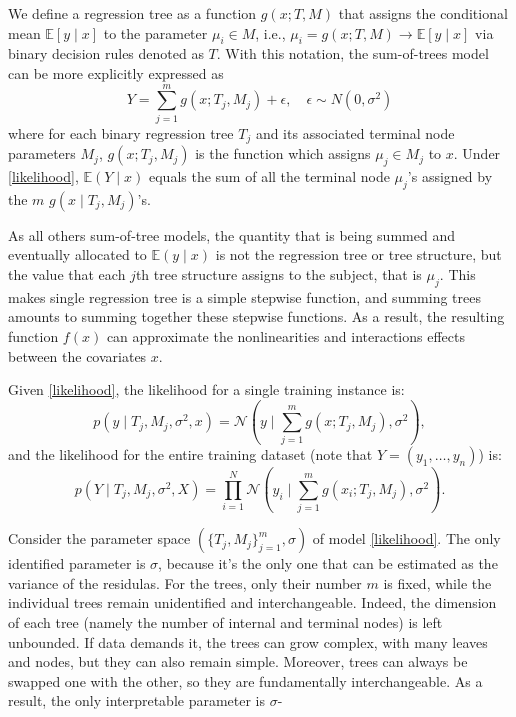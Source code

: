 \documentclass[a4paper,11pt]{article}
\begin{document}
We define a regression tree as a function \( g(x; T, M) \) that assigns the conditional mean \( \mathbb{E}[y \mid x] \) to the parameter \( \mu_i \in M \), i.e., \( \mu_i = g(x; T, M) \rightarrow \mathbb{E}[y \mid x] \) via binary decision rules denoted as \( T \). With this notation, the sum-of-trees model can be more explicitly expressed as
\begin{equation}
Y = \sum_{j=1}^m g(x; T_j, M_j) + \epsilon, \quad \epsilon \sim N(0, \sigma^2) \label{likelihood}
\end{equation}
where for each binary regression tree \( T_j \) and its associated terminal node parameters \( M_j \), \( g(x; T_j, M_j) \) is the function which assigns \( \mu_{j} \in M_j \) to \( x \). Under \eqref{likelihood}, \( \mathbb{E}(Y \mid x) \) equals the sum of all the terminal node \( \mu_{j} \)'s assigned by the $m$ \( g(x \mid T_j, M_j) \)'s.

 As all others sum-of-tree models, the quantity that is being summed and eventually allocated to \( \mathbb{E}(y \mid x) \) is not the regression tree or tree structure, but the value that each \( j \)th tree structure assigns to the subject, that is \( \mu_{j} \). This makes single regression tree is a simple stepwise function, and summing trees amounts to summing together these stepwise functions. As a result, the resulting function $f(x)$  can approximate the nonlinearities and  interactions effects between the covariates $x$.


Given \eqref{likelihood},  the likelihood for a single training instance is:
\[
p(y \mid T_j, M_j, \sigma^2, x) = \mathcal{N}\left(y \mid \sum_{j=1}^{m} g(x; T_j, M_j), \sigma^2\right),
\]
and the likelihood for the entire training dataset (note that $Y = (y_1, \ldots, y_n)$) is:
\[
p(Y \mid T_j, M_j, \sigma^2, X) = \prod_{i=1}^{N} \mathcal{N}\left(y_i \mid \sum_{j=1}^{m} g(x_i; T_j, M_j), \sigma^2\right).
\]

Consider the parameter space $(\{T_j, M_j\}_{j=1}^m, \sigma)$ of model \eqref{likelihood}. The only identified parameter is $\sigma$, because it's the only one that can be estimated as the variance of the residulas. For the trees, only their number $m$ is fixed, while the individual trees remain unidentified and interchangeable. Indeed, the dimension of each tree (namely the number of internal and terminal nodes) is left unbounded. If data demands it, the trees can grow complex, with many leaves and nodes, but they can also remain simple. Moreover, trees can always be swapped one with the other, so they are fundamentally interchangeable. As a result, the only interpretable parameter is $\sigma$-
\end{document}
